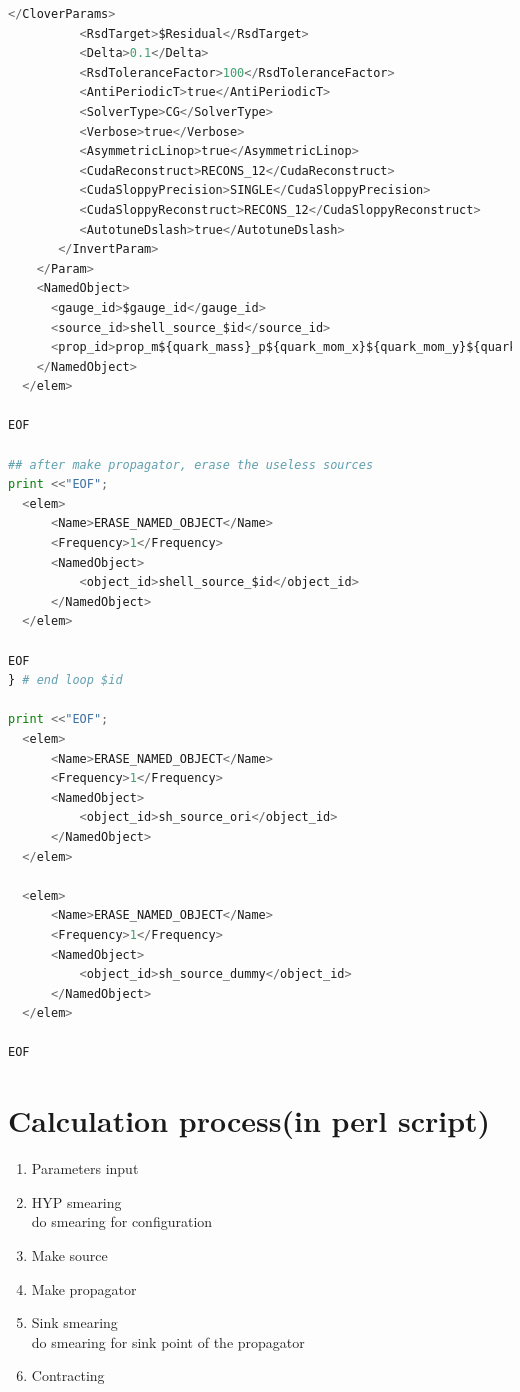 \documentclass{article}
\begin{document}
\begin{lstlisting}[language=Python]
          </CloverParams>
          <RsdTarget>$Residual</RsdTarget>
          <Delta>0.1</Delta>
          <RsdToleranceFactor>100</RsdToleranceFactor>            
          <AntiPeriodicT>true</AntiPeriodicT>
          <SolverType>CG</SolverType>
          <Verbose>true</Verbose>
          <AsymmetricLinop>true</AsymmetricLinop>
          <CudaReconstruct>RECONS_12</CudaReconstruct>
          <CudaSloppyPrecision>SINGLE</CudaSloppyPrecision>
          <CudaSloppyReconstruct>RECONS_12</CudaSloppyReconstruct>
          <AutotuneDslash>true</AutotuneDslash>
       </InvertParam>
    </Param>
    <NamedObject>
      <gauge_id>$gauge_id</gauge_id>
      <source_id>shell_source_$id</source_id>
      <prop_id>prop_m${quark_mass}_p${quark_mom_x}${quark_mom_y}${quark_mom_z}.src$id</prop_id>
    </NamedObject>
  </elem>

EOF

## after make propagator, erase the useless sources
print <<"EOF";
  <elem>
      <Name>ERASE_NAMED_OBJECT</Name>
      <Frequency>1</Frequency>
      <NamedObject>
          <object_id>shell_source_$id</object_id>
      </NamedObject>
  </elem>

EOF
} # end loop $id

print <<"EOF";
  <elem>
      <Name>ERASE_NAMED_OBJECT</Name>
      <Frequency>1</Frequency>
      <NamedObject>
          <object_id>sh_source_ori</object_id>
      </NamedObject>
  </elem>

  <elem>
      <Name>ERASE_NAMED_OBJECT</Name>
      <Frequency>1</Frequency>
      <NamedObject>
          <object_id>sh_source_dummy</object_id>
      </NamedObject>
  </elem>

EOF
\end{lstlisting}



\section{Calculation process(in perl script)}
\begin{enumerate}
  \item Parameters input
  \item HYP smearing \\
    do smearing for configuration
  \item Make source
  \item Make propagator
  \item Sink smearing \\
    do smearing for sink point of the propagator
  \item Contracting
\end{enumerate}
\end{document}
